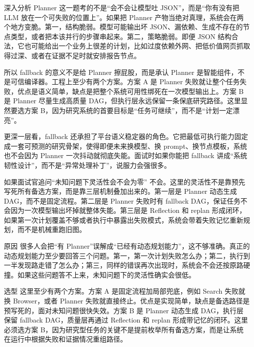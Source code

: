\documentclass[12pt]{article}
\begin{document}
\begin{analysisBox}{深入分析}
Planner 这一题考的不是“会不会让模型吐 JSON”，而是“你有没有把 LLM 放在一个可失败的位置上”。如果把 Planner 产物当绝对真理，系统会在两个地方变脆。第一，结构脆弱。模型可能输出坏 JSON、漏依赖、生成不存在的节点类型，或者把本该并行的步骤串起来。第二，策略脆弱。即便 JSON 结构合法，它也可能给出一个业务上很差的计划，比如过度依赖外网、把低价值网页抓取得过深、或者在证据不足时就安排报告节点。

所以 fallback 的意义不是给 Planner 擦屁股，而是承认 Planner 是智能组件，不是可信编译器。工程上至少有两个方案。方案 A 是 Planner 失败就让整个任务失败，优点是语义简单，缺点是把整个系统可用性绑死在一次模型输出上。方案 B 是 Planner 尽量生成高质量 DAG，但执行层永远保留一条保底研究路径。这里显然要选方案 B，因为研究系统的首要目标是“任务可继续”，而不是“计划一定漂亮”。

更深一层看，fallback 还承担了平台语义稳定器的角色。它把最低可执行能力固定成一套可预测的研究骨架，使得即便未来换模型、换 prompt、换节点模板，系统也不会因为 Planner 一次抖动就彻底失能。面试时如果你能把 fallback 讲成“系统韧性设计”，而不是“异常处理补丁”，说服力会强很多。
\end{analysisBox}

\begin{qaBox}{如果面试官追问“未知问题下灵活性会不会为零”}
不会。这里的灵活性不是靠预先写死所有备选方案，而是靠三层机制叠加出来的。第一层是 Planner 动态生成 DAG，而不是固定流程。第二层是 Planner 失败时有 fallback DAG，保证任务不会因为一次模型输出坏掉就整体失能。第三层是 Reflection 和 replan 形成闭环，如果第一次计划覆盖不够或者执行中暴露出失败模式，系统会带着失败记忆重新规划，而不是机械重跑旧图。
\end{qaBox}

\begin{qaBox}{原因}
很多人会把“有 Planner”误解成“已经有动态规划能力”，这不够准确。真正的动态规划能力至少要回答三个问题。第一，第一次计划失败怎么办；第二，执行到一半发现路走错了怎么办；第三，同样的错误再次出现时，系统会不会还按原路硬撞。如果这些问题答不上来，未知问题下的灵活性确实会很低。
\end{qaBox}

\begin{qaBox}{选型}
这里至少有两个方案。方案 A 是固定流程加局部兜底，例如 Search 失败就换 Browser，或者 Planner 失败就直接终止。优点是实现简单，缺点是备选路径是预写死的，面对未知问题很快失效。方案 B 是 Planner 动态生成 DAG，执行层保留 fallback DAG，质量层再通过 Reflection 和 replan 形成带记忆的闭环。这里必须选方案 B，因为研究型任务的关键不是提前枚举所有备选方案，而是让系统在运行中根据失败和证据情况重组路径。
\end{qaBox}
\end{document}
